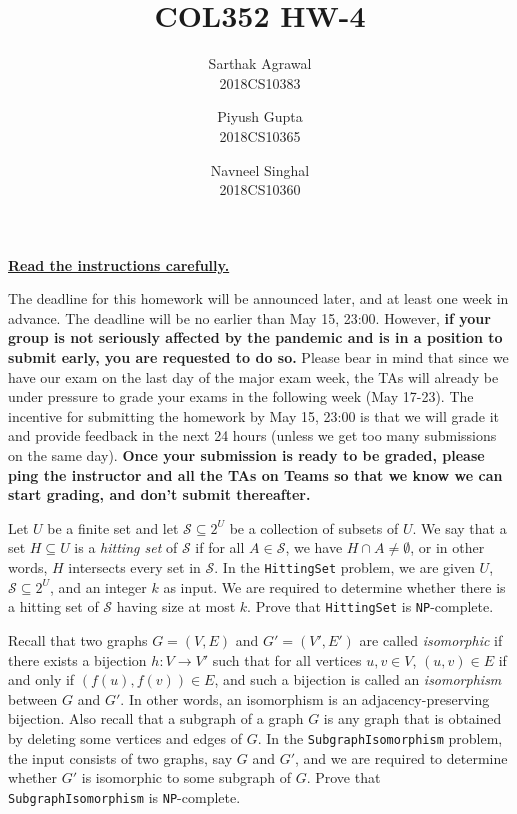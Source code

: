 \documentclass[10pt,addpoints]{exam}
\title{COL352 HW-4}
\author{
Sarthak Agrawal \\ 2018CS10383
\and
Piyush Gupta \\ 2018CS10365
\and
Navneel Singhal \\ 2018CS10360
}
\begin{document}
\maketitle

\noindent\href{https://moodle.iitd.ac.in/mod/forum/discuss.php?d=19210#p26977}{\textbf{Read the instructions carefully.}}

\vspace{0.5cm}


\noindent The deadline for this homework will be announced later, and at least one week in advance. The deadline will be no earlier than May 15, 23:00. However, \textbf{if your group is not seriously affected by the pandemic and is in a position to submit early, you are requested to do so.} Please bear in mind that since we have our exam on the last day of the major exam week, the TAs will already be under pressure to grade your exams in the following week (May 17-23). The incentive for submitting the homework by May 15, 23:00 is that we will grade it and provide feedback in the next 24 hours (unless we get too many submissions on the same day). \textbf{Once your submission is ready to be graded, please ping the instructor and all the TAs on Teams so that we know we can start grading, and don't submit thereafter.}

\newpage

\begin{prob} Let $U$ be a finite set and let $\mathcal{S}\subseteq2^U$ be a collection of subsets of $U$. We say that a set $H\subseteq U$ is a \textit{hitting set} of $\mathcal{S}$ if for all $A\in\mathcal{S}$, we have $H\cap A\neq\emptyset$, or in other words, $H$ intersects every set in $\mathcal{S}$. In the \texttt{HittingSet} problem, we are given $U$, $\mathcal{S}\subseteq2^U$, and an integer $k$ as input. We are required to determine whether there is a hitting set of $\mathcal{S}$ having size at most $k$. Prove that \texttt{HittingSet} is \texttt{NP}-complete.

\end{prob}

\newpage


\begin{prob} Recall that two graphs $G=(V,E)$ and $G'=(V',E')$ are called \textit{isomorphic} if there exists a bijection $h:V\longrightarrow V'$ such that for all vertices $u,v\in V$, $(u,v)\in E$ if and only if $(f(u),f(v))\in E$, and such a bijection is called an \textit{isomorphism} between $G$ and $G'$. In other words, an isomorphism is an adjacency-preserving bijection. Also recall that a subgraph of a graph $G$ is any graph that is obtained by deleting some vertices and edges of $G$. In the \texttt{SubgraphIsomorphism} problem, the input consists of two graphs, say $G$ and $G'$, and we are required to determine whether $G'$ is isomorphic to some subgraph of $G$. Prove that \texttt{SubgraphIsomorphism} is \texttt{NP}-complete.

\end{prob}
\end{document}
